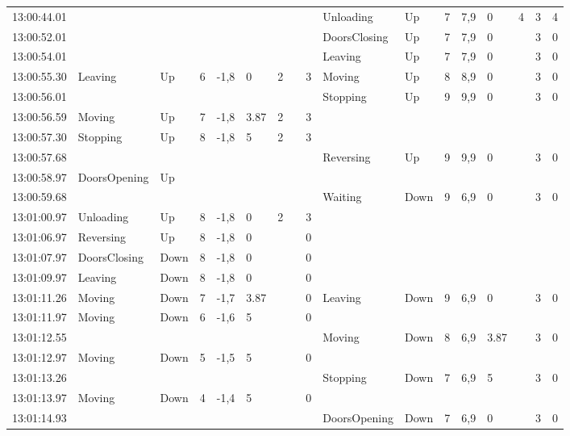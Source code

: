 \documentclass{UoYCSproject}
\begin{document}
\begin{appendices}
\begin{landscape}
\begin{longtable}{l || l | l | l | l | l | l | l | l || l | l | l | l | l | l | l | l}
	13:00:44.01 &  &  &  &  &  &  &  &  & Unloading & Up & 7 & 7,9 & 0 & 4 & 3 & 4 \\
	13:00:52.01 &  &  &  &  &  &  &  &  & DoorsClosing & Up & 7 & 7,9 & 0 &  & 3 & 0 \\
	13:00:54.01 &  &  &  &  &  &  &  &  & Leaving & Up & 7 & 7,9 & 0 &  & 3 & 0 \\
	13:00:55.30 & Leaving & Up & 6 & -1,8 & 0 & 2 &  & 3 & Moving & Up & 8 & 8,9 & 0 &  & 3 & 0 \\
	13:00:56.01 &  &  &  &  &  &  &  &  & Stopping & Up & 9 & 9,9 & 0 &  & 3 & 0 \\
	13:00:56.59 & Moving & Up & 7 & -1,8 & 3.87 & 2 &  & 3 &  &  &  &  &  &  &  &  \\
	13:00:57.30 & Stopping & Up & 8 & -1,8 & 5 & 2 &  & 3 &  &  &  &  &  &  &  &  \\
	13:00:57.68 &  &  &  &  &  &  &  &  & Reversing & Up & 9 & 9,9 & 0 &  & 3 & 0 \\
	13:00:58.97 & DoorsOpening & Up &  &  &  &  &  &  &  &  &  &  &  &  &  &  \\
	13:00:59.68 &  &  &  &  &  &  &  &  & Waiting & Down & 9 & 6,9 & 0 &  & 3 & 0 \\
	13:01:00.97 & Unloading & Up & 8 & -1,8 & 0 & 2 &  & 3 &  &  &  &  &  &  &  &  \\
	13:01:06.97 & Reversing & Up & 8 & -1,8 & 0 &  &  & 0 &  &  &  &  &  &  &  &  \\
	13:01:07.97 & DoorsClosing & Down & 8 & -1,8 & 0 &  &  & 0 &  &  &  &  &  &  &  &  \\
	13:01:09.97 & Leaving & Down & 8 & -1,8 & 0 &  &  & 0 &  &  &  &  &  &  &  &  \\
	13:01:11.26 & Moving & Down & 7 & -1,7 & 3.87 &  &  & 0 & Leaving & Down & 9 & 6,9 & 0 &  & 3 & 0 \\
	13:01:11.97 & Moving & Down & 6 & -1,6 & 5 &  &  & 0 &  &  &  &  &  &  &  &  \\
	13:01:12.55 &  &  &  &  &  &  &  &  & Moving & Down & 8 & 6,9 & 3.87 &  & 3 & 0 \\
	13:01:12.97 & Moving & Down & 5 & -1,5 & 5 &  &  & 0 &  &  &  &  &  &  &  &  \\
	13:01:13.26 &  &  &  &  &  &  &  &  & Stopping & Down & 7 & 6,9 & 5 &  & 3 & 0 \\
	13:01:13.97 & Moving & Down & 4 & -1,4 & 5 &  &  & 0 &  &  &  &  &  &  &  &  \\
	13:01:14.93 &  &  &  &  &  &  &  &  & DoorsOpening & Down & 7 & 6,9 & 0 &  & 3 & 0 \\

\end{longtable}
\end{landscape}
\end{appendices}
\end{document}
